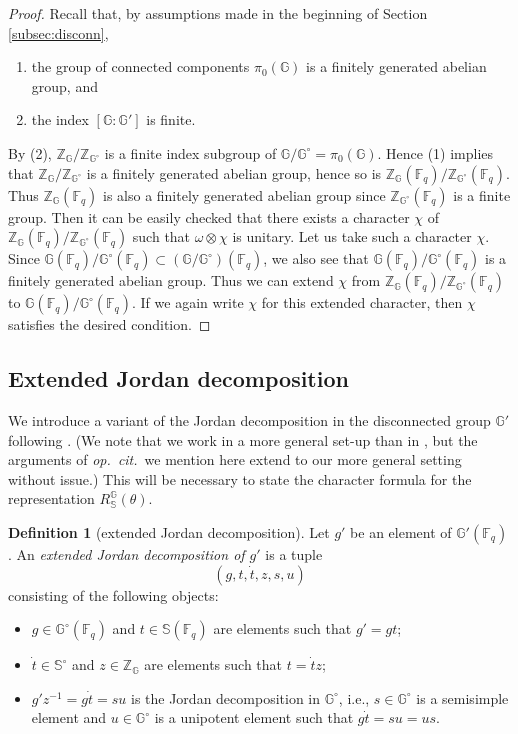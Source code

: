 \documentclass{amsart}
\newcommand{\F}{\mathbb{F}}
\newcommand{\bbS}{\mathbb{S}}
\newcommand{\bbG}{\mathbb{G}}
\newcommand{\bbZ}{\mathbb{Z}}
\theoremstyle{plain}
\theoremstyle{definition}
\newtheorem{defn}[thm]{Definition}
\theoremstyle{remark}
\theoremstyle{theorem}
\begin{document}
\begin{proof}
Recall that, by assumptions made in the beginning of Section \ref{subsec:disconn},
\begin{enumerate}
\item
the group of connected components $\pi_{0}(\bbG)$ is a finitely generated abelian group, and
\item
the index $[\bbG: \bbG']$ is finite.
\end{enumerate}
By (2), $\bbZ_{\bbG}/\bbZ_{\bbG^{\circ}}$ is a finite index subgroup of $\bbG/\bbG^{\circ}=\pi_{0}(\bbG)$.
Hence (1) implies that $\bbZ_{\bbG}/\bbZ_{\bbG^{\circ}}$ is a finitely generated abelian group, hence so is $\bbZ_{\bbG}(\F_{q})/\bbZ_{\bbG^{\circ}}(\F_{q})$.
Thus $\bbZ_{\bbG}(\F_{q})$ is also a finitely generated abelian group since $\bbZ_{\bbG^{\circ}}(\F_{q})$ is a finite group.
Then it can be easily checked that there exists a character $\chi$ of $\bbZ_{\bbG}(\F_{q})/\bbZ_{\bbG^{\circ}}(\F_{q})$ such that $\omega\otimes\chi$ is unitary.
Let us take such a character $\chi$.
Since $\bbG(\F_{q})/\bbG^{\circ}(\F_{q})\subset (\bbG/\bbG^{\circ})(\F_{q})$, we also see that $\bbG(\F_{q})/\bbG^{\circ}(\F_{q})$ is a finitely generated abelian group.
Thus we can extend $\chi$ from $\bbZ_{\bbG}(\F_{q})/\bbZ_{\bbG^{\circ}}(\F_{q})$ to $\bbG(\F_{q})/\bbG^{\circ}(\F_{q})$.
If we again write $\chi$ for this extended character, then $\chi$ satisfies the desired condition.
\end{proof}



\subsection{Extended Jordan decomposition}\label{subsec:extended_jordan}

We introduce a variant of the Jordan decomposition in the disconnected group $\bbG'$ following \cite{Kal19}.
(We note that we work in a more general set-up than in \cite{Kal19}, but the arguments of \textit{op.\ cit.}\ we mention here extend to our more general setting without issue.)
This will be necessary to state the character formula for the representation $R_{\bbS}^{\bbG}(\theta)$.

\begin{defn}[extended Jordan decomposition]
Let $g'$ be an element of $\bbG'(\F_{q})$.
An \textit{extended Jordan decomposition of $g'$} is a tuple 
\[
(g,t,\dot{t},z,s,u)
\] consisting of the following objects:
\begin{itemize}
\item
$g\in\bbG^{\circ}(\F_{q})$ and $t\in\bbS(\F_{q})$ are elements such that $g'=gt$;
\item
$\dot{t}\in\bbS^{\circ}$ and $z\in\bbZ_{\bbG}$ are elements such that $t=\dot{t}z$;
\item
$g'z^{-1} = g\dot{t}=su$ is the Jordan decomposition in $\bbG^{\circ}$, i.e., $s\in\bbG^{\circ}$ is a semisimple element and $u\in\bbG^{\circ}$ is a unipotent element such that $g\dot{t}=su=us$.
\end{itemize}
\end{defn}
\end{document}
